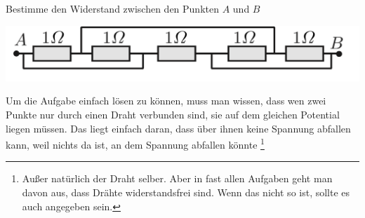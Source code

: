\flushleft
\begin{minipage}{.75\textwidth}
\begin{Exercise}[label = wdsstrecke, title = Widerstandsstrecke, difficulty = 3, origin = IPhO 1996 ]
Bestimme den Widerstand zwischen den Punkten $A$ und $B$
	\end{Exercise}
\end{minipage}
\hfill
\begin{minipage}{.2\textwidth}
	\centering
	\includegraphics[scale = .2]{../tasks/ipho/wdsstrecke.png}
\end{minipage}
\begin{Answer}[ref = wdsstrecke]
	Um die Aufgabe einfach lösen zu können, muss man wissen, dass wen zwei Punkte nur durch einen Draht verbunden sind, sie auf dem gleichen Potential liegen müssen. Das liegt einfach daran, dass über ihnen keine Spannung abfallen kann, weil nichts da ist, an dem Spannung abfallen könnte \footnote{Außer natürlich der Draht selber. Aber in fast allen Aufgaben geht man davon aus, dass Drähte widerstandsfrei sind. Wenn das nicht so ist, sollte es auch angegeben sein.}
\end{Answer}